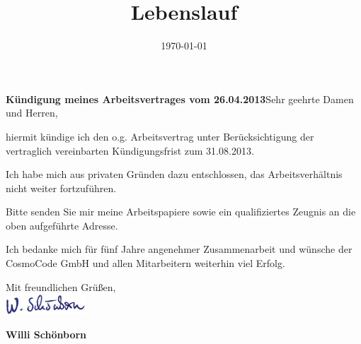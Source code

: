 \documentclass[11pt,a4paper,sans]{moderncv} %
\title{Lebenslauf}
\begin{document}


\clearpage

\date{\today} %
\opening{\textbf{Kündigung meines Arbeitsvertrages vom 26.04.2013}\newline{}\newline{}Sehr geehrte Damen und Herren,} %
\closing{} %

\makelettertitle %

hiermit kündige ich den o.g. Arbeitsvertrag unter Berücksichtigung der vertraglich vereinbarten Kündigungsfrist zum 31.08.2013.
 
Ich habe mich aus privaten Gründen dazu entschlossen, das Arbeitsverhältnis nicht weiter fortzuführen.
 
Bitte senden Sie mir meine Arbeitspapiere sowie ein qualifiziertes Zeugnis an die oben aufgeführte Adresse. 

Ich bedanke mich für fünf Jahre angenehmer Zusammenarbeit und wünsche der CosmoCode GmbH und allen Mitarbeitern weiterhin viel Erfolg.

Mit freundlichen Grüßen,\\[1.5em]
\includegraphics[width=3cm]{pictures/signature}

\bfseries{Willi Schönborn}


\end{document}
